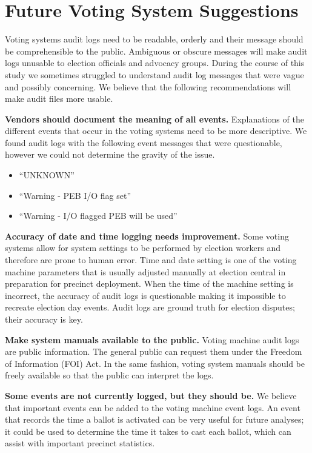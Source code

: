 \section{Future Voting System Suggestions}
Voting systems audit logs need to be readable, orderly and their message should be  comprehensible to the public. Ambiguous or obscure messages will make audit logs unusable to election officials and advocacy groups. During the course of this study we sometimes struggled to understand audit log messages that were vague and possibly concerning. We believe that the following recommendations will make audit files more usable.

\textbf{Vendors should document the meaning of all events.} Explanations of the different events that occur in the voting systems need to be more descriptive.  We found audit logs with the following event messages that were questionable, however we could not determine the gravity of the issue.
\begin{itemize}
	\item \textquotedblleft UNKNOWN\textquotedblright
	\item \textquotedblleft Warning - PEB I/O flag set\textquotedblright
	\item \textquotedblleft Warning - I/O flagged PEB will be used\textquotedblright
\end{itemize}

\textbf{Accuracy of date and time logging needs improvement.} Some voting systems allow for system settings to be performed by election workers and therefore are prone to human error. Time and date setting is one of the voting machine parameters that is usually adjusted manually at election central in preparation for precinct deployment. When the time of the machine setting is incorrect, the accuracy of audit logs is questionable making it impossible to recreate election day events. Audit logs are ground truth for election disputes; their accuracy is key.

\textbf{Make system manuals available to the public.} Voting machine audit logs are public information. The general public can request them under the Freedom of Information (FOI) Act. In the same fashion, voting system manuals should be freely available so that the public can interpret the logs. 

\textbf{Some events are not currently logged, but they should be.} We believe that important events can be added to the voting machine event logs. An event that records the time a ballot is activated can be very useful for future analyses; it could be used to determine the time it takes to cast each ballot, which can assist with important precinct statistics.